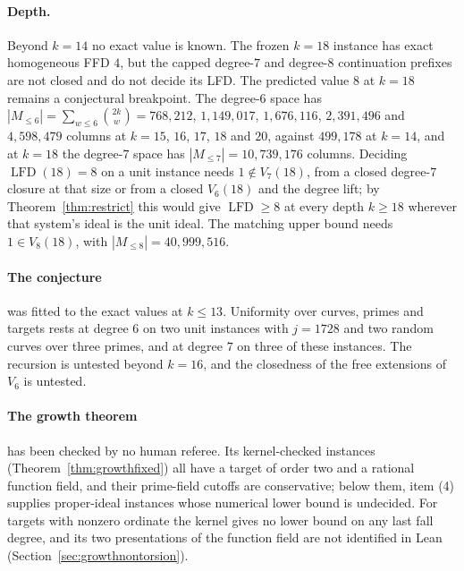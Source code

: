 \documentclass[11pt]{article}
\theoremstyle{definition}\newtheorem{definition}[theorem]{Definition}
\theoremstyle{remark}\newtheorem{remark}[theorem]{Remark}
\newcommand{\lfd}{\operatorname{LFD}}
\begin{document}
\paragraph{Depth.} Beyond $k=14$ no exact value is known. The frozen
$k=18$ instance has exact homogeneous FFD $4$, but the capped degree-$7$
and degree-$8$ continuation prefixes are not closed and do not decide its
LFD. The predicted value $8$ at $k=18$ remains a conjectural breakpoint.
The degree-$6$ space has
$|M_{\le6}|=\sum_{w\le6}\binom{2k}{w}=768{,}212$, $1{,}149{,}017$,
$1{,}676{,}116$, $2{,}391{,}496$ and $4{,}598{,}479$ columns at $k=15$,
$16$, $17$, $18$ and $20$, against $499{,}178$ at $k=14$, and at $k=18$ the
degree-$7$ space has $|M_{\le7}|=10{,}739{,}176$ columns. Deciding
$\lfd(18)=8$ on a unit instance needs $1\notin V_7(18)$, from a closed
degree-$7$ closure at that size or from a closed $V_6(18)$ and the degree
lift; by Theorem~\ref{thm:restrict} this would give $\lfd\ge8$ at every
depth $k\ge18$ wherever that system's ideal is the unit ideal. The matching
upper bound needs $1\in V_8(18)$, with $|M_{\le8}|=40{,}999{,}516$.

\paragraph{The conjecture} was fitted to the exact values at $k\le13$.
Uniformity over curves, primes and targets rests at degree $6$ on two unit
instances with $j=1728$ and two random curves over three primes, and at
degree $7$ on three of these instances. The recursion is untested beyond
$k=16$, and the closedness of the free extensions of $V_6$ is untested.

\paragraph{The growth theorem} has been checked by no human referee. Its
kernel-checked instances (Theorem~\ref{thm:growthfixed}) all have a target
of order two and a rational function field, and their prime-field cutoffs
are conservative; below them, item (4) supplies proper-ideal instances whose
numerical lower bound is undecided. For targets with nonzero ordinate the
kernel gives no lower bound on any last fall degree, and its two
presentations of the function field are not identified in Lean
(Section~\ref{sec:growthnontorsion}).
\end{document}
